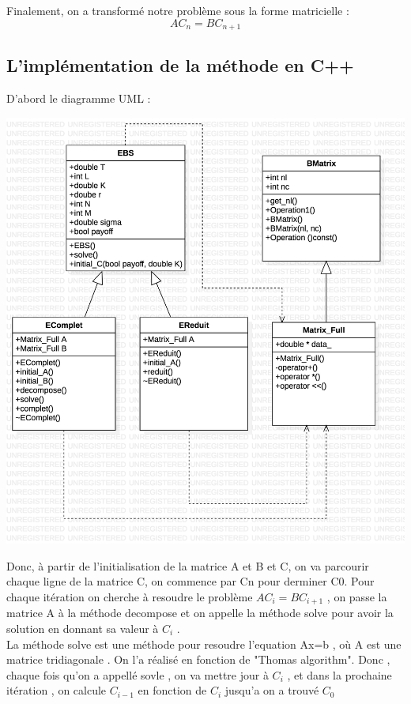 \documentclass[a4paper, 12pt]{article}
\begin{document}
Finalement, on a transformé notre problème sous la forme matricielle :\\
\[
\boxed{AC_n = BC_{n+1}}
\]

\subsection{L'implémentation de la méthode en C++}

D'abord le diagramme UML :


\includegraphics[scale=0.3]{Images/Main.png} 

Donc,  à partir de l'initialisation de la matrice A et B et C, on va parcourir chaque ligne de la matrice C, on commence par Cn pour derminer C0. Pour chaque itération on cherche à resoudre le problème $AC_i = BC_{i+1}$ , on passe la matrice A à la méthode decompose et on appelle la méthode solve pour avoir la solution en donnant sa valeur à $C_i$ .\\

La méthode solve est une méthode pour resoudre l'equation Ax=b , où A est une matrice tridiagonale . On l'a réalisé en fonction de "Thomas algorithm".  Donc , chaque fois qu'on a appellé sovle , on va mettre jour à $C_i$ , et dans la prochaine itération , on calcule $C_{i-1}$ en fonction de $C_i$ jusqu'a on a trouvé $C_0$
\end{document}
